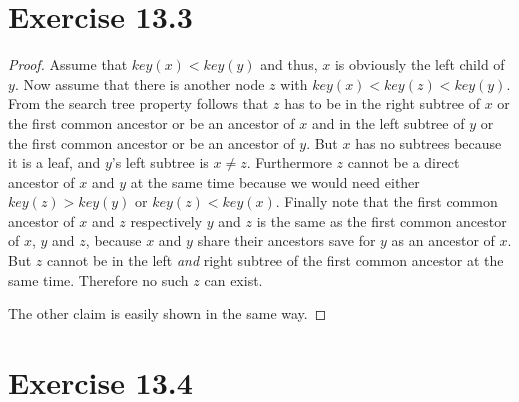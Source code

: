 \documentclass[10pt,a4paper]{article}
\begin{document}
\section*{Exercise 13.3}

\begin{proof}
  Assume that $key(x) < key(y)$ and thus, $x$ is obviously the left child of $y$.
  Now assume that there is another node $z$ with $key(x) < key(z) < key(y)$.
  From the search tree property follows that $z$ has to be in the right subtree of $x$ or the first common ancestor or be an ancestor of $x$ and in the left subtree of $y$ or the first common ancestor or be an ancestor of $y$.
  But $x$ has no subtrees because it is a leaf, and $y$'s left subtree is $x \ne z$.
  Furthermore $z$ cannot be a direct ancestor of $x$ and $y$ at the same time because we would need either $key(z) > key(y)$ or $key(z) < key(x)$.
  Finally note that the first common ancestor of $x$ and $z$ respectively $y$ and $z$ is the same as the first common ancestor of $x$, $y$ and $z$, because $x$ and $y$ share their ancestors save for $y$ as an ancestor of $x$.
  But $z$ cannot be in the left \emph{and} right subtree of the first common ancestor at the same time.
  Therefore no such $z$ can exist.

  The other claim is easily shown in the same way.
\end{proof}

\section*{Exercise 13.4}
\end{document}
